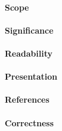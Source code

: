 \documentclass{jhps}
\begin{document}
\paragraph{Scope}   %



\paragraph{Significance}   %


\paragraph{Readability}   %


\paragraph{Presentation}



\paragraph{References}   %

\paragraph{Correctness}   %
\end{document}
